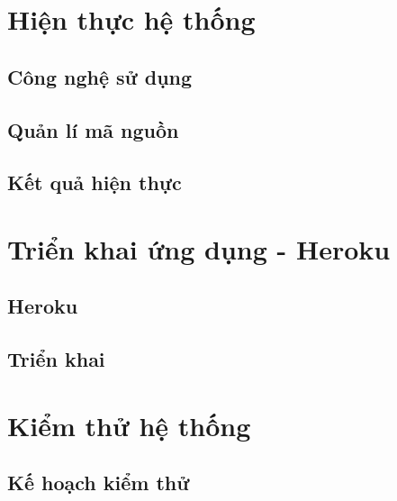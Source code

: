 \documentclass[a4paper,12pt,fleqn,print,oneside]{extarticle}
\begin{document}
% 

\newpage
\section{Hiện thực hệ thống}
\subsection{Công nghệ sử dụng}


\subsection{Quản lí mã nguồn}



\subsection{Kết quả hiện thực}


\newpage
\section{Triển khai ứng dụng - Heroku}
\subsection{Heroku}


\subsection{Triển khai}



\newpage
\section{Kiểm thử hệ thống}


\subsection{Kế hoạch kiểm thử}

\end{document}
